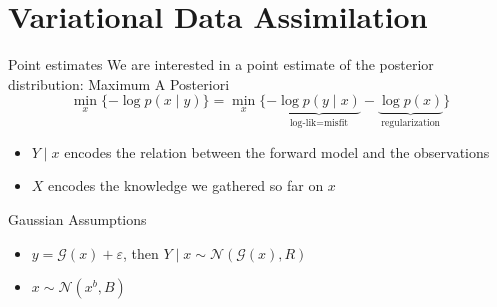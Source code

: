 \documentclass[10pt,aspectratio=169]{beamer}
\begin{document}
\section{Variational Data Assimilation}
\begin{frame}{Point estimates}
    We are interested in a point estimate of the posterior distribution: \alert{M}aximum \alert{A P}osteriori 
    \begin{equation}
        \min_x \{ -\log p(x \mid y) \} =\min_x\{ - \underbrace{\log p(y\mid x)}_{\text{log-lik=misfit}} - \underbrace{\log p(x)}_{\text{regularization}} \}
    \end{equation}
         \begin{itemize}
          \item $Y \mid x$ encodes the relation between the forward model and the observations
          \item $X$ encodes the knowledge we gathered so far on $x$ 
      \end{itemize}
    \begin{block}{Gaussian Assumptions}
 \begin{itemize}
     \item $y = \mathcal{G}(x) + \varepsilon$, then $Y \mid x \sim\mathcal{N}(\mathcal{G}(x), R)$ 
     \item $x \sim \mathcal{N}(x^b, B)$
 \end{itemize}
    \end{block}
\end{frame}
\end{document}
